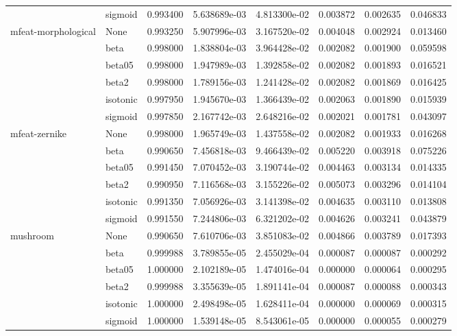 \begin{tabular}{llrrrrrr}
        & sigmoid &  0.993400 &  5.638689e-03 &  4.813300e-02 &  0.003872 &  0.002635 &  0.046833 \\
mfeat-morphological & None &  0.993250 &  5.907996e-03 &  3.167520e-02 &  0.004048 &  0.002924 &  0.013460 \\
        & beta &  0.998000 &  1.838804e-03 &  3.964428e-02 &  0.002082 &  0.001900 &  0.059598 \\
        & beta05 &  0.998000 &  1.947989e-03 &  1.392858e-02 &  0.002082 &  0.001893 &  0.016521 \\
        & beta2 &  0.998000 &  1.789156e-03 &  1.241428e-02 &  0.002082 &  0.001869 &  0.016425 \\
        & isotonic &  0.997950 &  1.945670e-03 &  1.366439e-02 &  0.002063 &  0.001890 &  0.015939 \\
        & sigmoid &  0.997850 &  2.167742e-03 &  2.648216e-02 &  0.002021 &  0.001781 &  0.043097 \\
mfeat-zernike & None &  0.998000 &  1.965749e-03 &  1.437558e-02 &  0.002082 &  0.001933 &  0.016268 \\
        & beta &  0.990650 &  7.456818e-03 &  9.466439e-02 &  0.005220 &  0.003918 &  0.075226 \\
        & beta05 &  0.991450 &  7.070452e-03 &  3.190744e-02 &  0.004463 &  0.003134 &  0.014335 \\
        & beta2 &  0.990950 &  7.116568e-03 &  3.155226e-02 &  0.005073 &  0.003296 &  0.014104 \\
        & isotonic &  0.991350 &  7.056926e-03 &  3.141398e-02 &  0.004635 &  0.003110 &  0.013808 \\
        & sigmoid &  0.991550 &  7.244806e-03 &  6.321202e-02 &  0.004626 &  0.003241 &  0.043879 \\
mushroom & None &  0.990650 &  7.610706e-03 &  3.851083e-02 &  0.004866 &  0.003789 &  0.017393 \\
        & beta &  0.999988 &  3.789855e-05 &  2.455029e-04 &  0.000087 &  0.000087 &  0.000292 \\
        & beta05 &  1.000000 &  2.102189e-05 &  1.474016e-04 &  0.000000 &  0.000064 &  0.000295 \\
        & beta2 &  0.999988 &  3.355639e-05 &  1.891141e-04 &  0.000087 &  0.000088 &  0.000343 \\
        & isotonic &  1.000000 &  2.498498e-05 &  1.628411e-04 &  0.000000 &  0.000069 &  0.000315 \\
        & sigmoid &  1.000000 &  1.539148e-05 &  8.543061e-05 &  0.000000 &  0.000055 &  0.000279 \\

\end{tabular}
